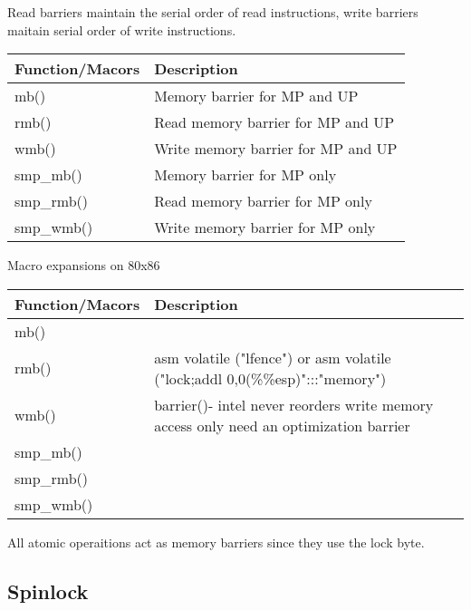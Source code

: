 \documentclass{article}
\begin{document}
Read barriers maintain the serial order of read instructions, write
barriers maitain serial order of write instructions.

\begin{center}
  \begin{tabular}{ l | l }    
    \hline
    Function/Macors & Description \\ \hline
    mb() & Memory barrier for MP and UP \\ 
    rmb() & Read memory barrier for MP and UP  \\ 
    wmb() &  Write memory barrier for MP and UP \\
    smp\_mb() &  Memory barrier for MP only \\
    smp\_rmb() &  Read memory barrier for MP only \\
    smp\_wmb() &  Write memory barrier for MP only \\
    \hline
  \end{tabular}
\end{center}
  Macro expansions on  80x86

  \begin{center}
  \begin{tabular}{ l | l }    
    \hline
    Function/Macors & Description \\ \hline
    mb() &  \\ 
    rmb() & asm volatile ("lfence") or asm volatile ("lock;addl 0,0(\%\%esp)":::"memory")  \\ 
    wmb() & barrier()- intel never reorders write memory access only need an optimization barrier  \\
    smp\_mb() &   \\
    smp\_rmb() &  \\
    smp\_wmb() &  \\
    \hline
  \end{tabular}
\end{center}

All atomic operaitions act as memory barriers since they use the lock byte.

\subsection{Spinlock}
\end{document}
